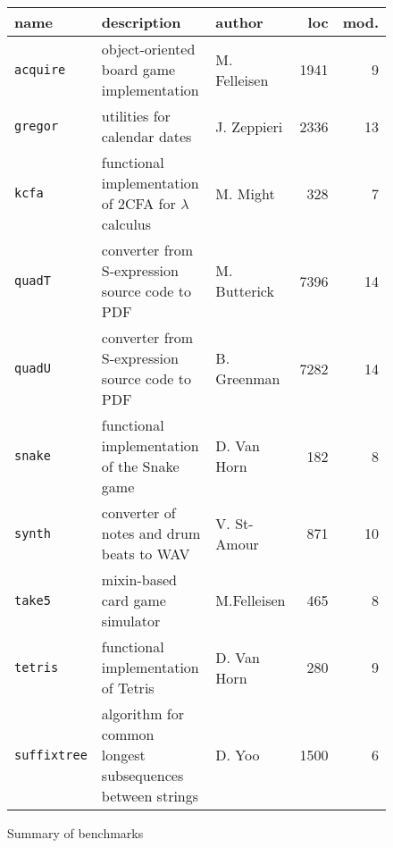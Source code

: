 
\begin{figure*} \footnotesize
\begin{tabular}{p{1.5cm} | p{6.9cm} | p{1.9cm} | r | r}
             {\bf  name} & {\bf description} & {\bf author} & {\bf loc} & {\bf mod.} \\ \hline

\texttt{acquire} & object-oriented board game implementation      & M. Felleisen & 1941 & 9 \\ \hline

\texttt{gregor}  & utilities for calendar dates                   & J. Zeppieri  & 2336 & 13\\ \hline

\texttt{kcfa}    & functional implementation of 2CFA for \(\lambda\) calculus       & M. Might & 328 & 7\\ \hline

\texttt{quadT}   & converter from S-expression source code to PDF & M. Butterick & 7396 & 14\\ \hline

\texttt{quadU}   & converter from S-expression source code to PDF & B. Greenman  & 7282 & 14 \\ \hline

\texttt{snake}   & functional implementation of the Snake game    & D. Van Horn & 182 & 8 \\ \hline

\texttt{synth}  & converter of notes and drum beats to WAV & V. St-Amour & 871 & 10 \\ \hline

\texttt{take5} & mixin-based card game simulator & M.Felleisen & 465 & 8\\ \hline

\texttt{tetris} & functional implementation of Tetris & D. Van Horn &   280 & 9 \\ \hline

\texttt{suffix\-tree} & algorithm for common longest subsequences between strings & D. Yoo & 1500 & 6 \\

\end{tabular}

\caption{Summary of benchmarks} \label{table:benchmark-descriptions}

\end{figure*}

